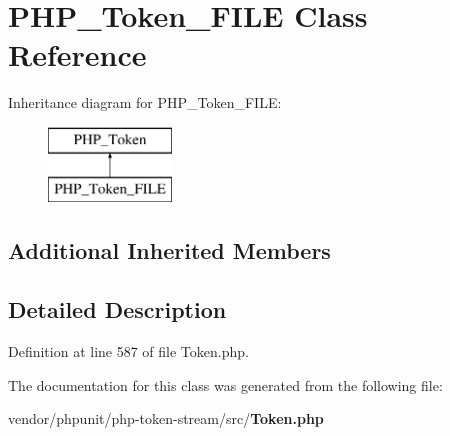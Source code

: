 \section{P\+H\+P\+\_\+\+Token\+\_\+\+F\+I\+L\+E Class Reference}
\label{class_p_h_p___token___f_i_l_e}
Inheritance diagram for P\+H\+P\+\_\+\+Token\+\_\+\+F\+I\+L\+E\+:\begin{figure}[H]
\begin{center}
\leavevmode
\includegraphics[height=2.000000cm]{class_p_h_p___token___f_i_l_e}
\end{center}
\end{figure}
\subsection*{Additional Inherited Members}


\subsection{Detailed Description}


Definition at line 587 of file Token.\+php.



The documentation for this class was generated from the following file\+:\begin{DoxyCompactItemize}
\item 
vendor/phpunit/php-\/token-\/stream/src/{\bf Token.\+php}\end{DoxyCompactItemize}
